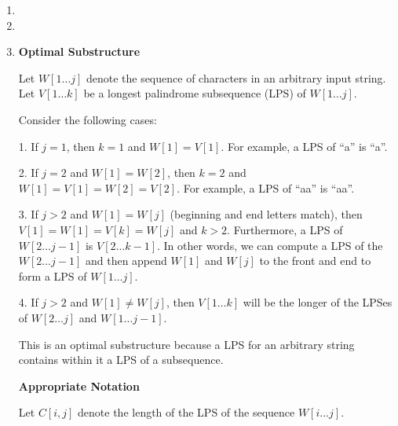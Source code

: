 \documentclass[a4paper]{report}
\begin{document}
\begin{enumerate}
    \par
    \bigskip
    \pagebreak
    \setcounter{equation}{0}
    
    \item 





    
    \bigskip
    \setcounter{equation}{0}

    \item 

    \pagebreak
    \bigskip
    \setcounter{equation}{0}
    \item 
      {\bf Optimal Substructure}

      Let $W[1\dots j]$ denote the sequence of characters in an arbitrary input string. Let $V[1\dots k]$
      be a longest palindrome subsequence (LPS) of $W[1\dots j]$. 

      Consider the following cases:

      1. If $j=1$, then $k=1$ and $W[1] = V[1]$. For example, a LPS of ``a'' is ``a''.

      2. If $j=2$ and $W[1] = W[2]$, then $k=2$ and $W[1] = V[1] = W[2] = V[2]$. For example, a LPS of ``aa'' is ``aa''.

      3. If $j>2$ and $W[1] = W[j]$ (beginning and end letters match), then $V[1] = W[1] = V[k] = W[j]$ and $k>2$. 
      Furthermore, a LPS of $W[2 \dots j-1]$ is $V[2\dots k-1]$. In other words, we can compute a LPS of the 
      $W[2 \dots j-1]$ and then append $W[1]$ and $W[j]$ to the front and end to form a LPS of $W[1\dots j]$.

      4. If $j>2$ and $W[1] \neq W[j]$, then $V[1\dots k]$ will be the longer of the LPSes of $W[2\dots j]$ and $W[1\dots j-1]$.

      This is an optimal substructure because a LPS for an arbitrary string contains within it a LPS of a subsequence.

      {\bf Appropriate Notation}

      Let $C[i, j]$ denote the length of the LPS of the sequence $W[i\dots j]$.


\end{enumerate}
\end{document}
